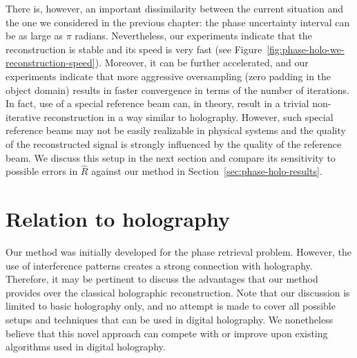 There is, however, an important dissimilarity between the current
situation and the one we considered in the previous chapter: the phase
uncertainty interval can be as large as $\pi$ radians. Nevertheless,
our experiments indicate that the reconstruction is stable and its
speed is very fast (see Figure~\ref{fig:phase-holo-we-reconstruction-speed}).
Moreover, it can be further accelerated, and our experiments indicate
that more aggressive oversampling (zero padding in the object domain)
results in faster convergence in terms of the number of iterations. In
fact, use of a special reference beam can, in theory, result in a
trivial non-iterative reconstruction in a way similar to
holography. However, such special reference beams may not be easily
realizable in physical systems and the quality of the reconstructed
signal is strongly influenced by the quality of the reference beam. We
discuss this setup in the next section and compare its sensitivity to
possible errors in $\hat{R}$ against our method in
Section~\ref{sec:phase-holo-results}.

\section{Relation to holography}
\label{sec:relation-holography}

Our method was initially developed for the phase retrieval
problem. However, the use of interference patterns creates a
strong connection with holography. Therefore, it may be pertinent
to discuss the advantages that our method provides over the classical
holographic reconstruction. Note that our discussion is limited to
basic holography only, and no attempt is made to cover all possible
setups and techniques that can be used in digital holography. We
nonetheless believe that this novel approach can compete with or
improve upon existing algorithms used in digital holography.


